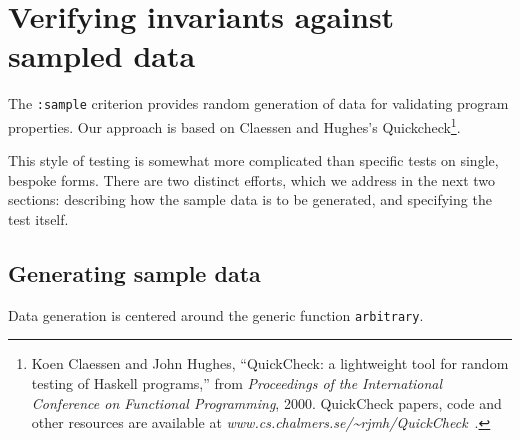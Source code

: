 
\section{Verifying invariants against sampled data}
\label{quickcheck}
The \texttt{:sample} criterion provides random
generation of data for validating program properties.  Our approach is
based on Claessen and Hughes's Quickcheck\footnote{Koen Claessen and
  John Hughes, ``QuickCheck: a lightweight tool for random testing of
  Haskell programs,'' from \emph{Proceedings of the International
    Conference on Functional Programming}, 2000.  QuickCheck papers,
  code and other resources are available at
  \textsl{www.cs.chalmers.se/\~{}rjmh/QuickCheck}~.}.

This style of testing is somewhat more complicated than specific tests
on single, bespoke forms.  There are two distinct efforts, which we
address in the next two sections: describing how the sample data is to
be generated, and specifying the test itself.

\subsection{Generating sample data}
\label{sec:quickcheck-data}
Data generation is centered around the generic function
\texttt{arbitrary}. %


